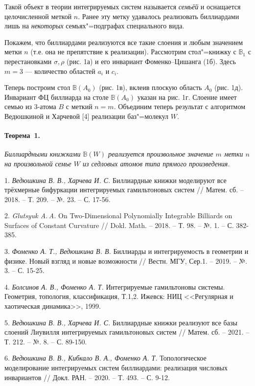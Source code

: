 Такой объект в теории интегрируемых систем называется \textit{семьёй} и оснащается целочисленной меткой $n$. Ранее эту метку удавалось реализовать биллиардами лишь на \textit{некоторых} семьях"=подграфах специального вида. %

Покажем, что биллиардами реализуются все такие слоения и любым значением метки $n$ (т.е. она не препятствие к реализации). Рассмотрим стол"=книжку с  $\mathbb{B}_1$ с перестановками $\sigma, \rho$ (рис. 1а) и его инвариант Фоменко--Цишанга (1б). Здесь $m = 3$ --- количество областей $a_i$ и $c_i$.

Теперь построим стол $\mathbb{B}(A_0)$ (рис. 1в), вклеив плоскую область $A_0$ (рис. 1д). Инвариант ФЦ биллиарда на столе $\mathbb{B}(A_0)$ указан на рис. 1г. Слоение имеет семью из 3-атома $B$ с меткий $n = m$. Объединим теперь результат с алгоритмом Ведюшкиной и Харчевой [4]  реализации баз"=молекул $W$.

\paragraph{Теорема~1.}
{\it
	Биллиардными книжками $\mathbb{B}(W)$ реализуется произвольное значение $m$ метки $n$ на произвольной семье $W$ из седловых атомов типа прямого произведения.
}


\begin{figure}[h]
			\label{elementarybilliards}
		\end{figure}


\litlist

1. {\it Ведюшкина В. В., Харчева И. С.}
Биллиардные книжки моделируют все трёхмерные бифуркации интегрируемых гамильтоновых систем // Матем. сб. – 2018. – Т. 209. – №. 23. – С. 17-56.

2. {\it Glutsyuk A.\,A.} On Two-Dimensional Polynomially Integrable Billiards
on Surfaces of Constant Curvature // Dokl. Math. – 2018. – Т. 98. – №. 1. – С. 382-385.

3. {\it Фоменко А. Т., Ведюшкина В. В.} Биллиарды и интегрируемость в геометрии и физике. Новый взгляд и новые возможности // Вестн. МГУ, Сер.1. – 2019. – №. 3. – С. 15-25.

4. {\it Болсинов А. В., Фоменко А. Т.}
Интегрируемые гамильтоновы системы. Геометрия, топология, классификация, Т.1,2.
Ижевск: НИЦ <<Регулярная и хаотическая динамика>>, 1999.

5. {\it Ведюшкина В. В., Харчева И. С.}
Биллиардные книжки реализуют все базы слоений Лиувилля интегрируемых гамильтоновых систем // Матем. сб. – 2021. – Т. 212. – №. 8. – С. 89-150.

6. {\it Ведюшкина В. В.,  Кибкало В. А., Фоменко А. Т.} Топологическое моделирование интегрируемых систем биллиардами: реализация числовых инвариантов // Докл. РАН. – 2020. – Т. 493. – С. 9-12.
